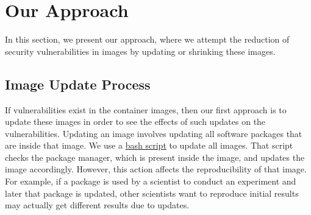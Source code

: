 \documentclass[a4paper,num-refs]{oup-contemporary}
\begin{document}
\section{Our Approach}

In this section, we present our approach, where we attempt the reduction
of security vulnerabilities in images by updating or
shrinking these images.

\subsection{Image Update Process}

If vulnerabilities exist in the container images, then our first approach
is to update these images in order to see the effects of such updates
on the vulnerabilities.
Updating an image involves updating all software packages that are
inside that image. We use a 
\href{https://github.com/kaurbhupinder/Vulnerability-Analysis/blob/master/Scripts/update/update.sh}{bash script} 
to update all images. That script checks the
package manager, which is present inside the image, and updates the image
accordingly. However, this action affects the reproducibility
of that image. For example, if a package is used by a scientist to conduct an experiment
and later that package is updated, other scientists want to reproduce initial results may actually
get different results due to updates.
\end{document}
